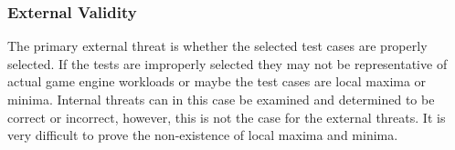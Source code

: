 \subsubsection{External Validity}
The primary external threat is whether the selected test cases are properly selected. If the tests are improperly selected they may not be representative of actual game engine workloads or maybe the test cases are local maxima or minima. Internal threats can in this case be examined and determined to be correct or incorrect, however, this is not the case for the external threats. It is very difficult to prove the non-existence of local maxima and minima.


